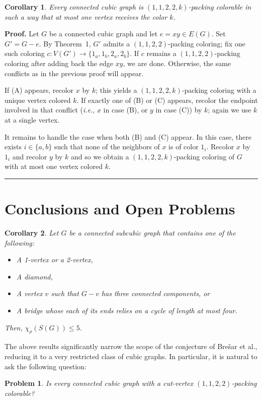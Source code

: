 \documentclass[12pt, oneside]{scrartcl}
\newtheorem{corollary}{Corollary}%
\newtheorem{problem}{Problem}
\newenvironment{proof}[1][Proof]{\textbf{#1.} }{\ \rule{0.5em}{0.5em}}
\begin{document}
\begin{corollary}
Every connected cubic graph is $(1,1,2,2,k)$-packing colorable in such a way that at most one vertex receives the color $k$.
\end{corollary}
\begin{proof}
Let $G$ be a connected cubic graph and let $e=xy\in E(G)$. Set $G'=G-e$. By Theorem~1, $G'$ admits a $(1,1,2,2)$-packing coloring; fix one such coloring
$c:V(G')\to\{1_a,1_b,2_a,2_b\}$.
If $c$ remains a $(1,1,2,2)$-packing coloring after adding back the edge $xy$, we are done. Otherwise, the same conflicts as in the previous proof will appear.

If \textup{(A)} appears, recolor $x$ by $k$; this yields a $(1,1,2,2,k)$-packing coloring with a unique vertex colored $k$.  
If exactly one of \textup{(B)} or \textup{(C)} appears, recolor the endpoint involved in that conflict (\emph{i.e.}, $x$ in case \textup{(B)}, or $y$ in case \textup{(C)}) by $k$; again we use $k$ at a single vertex.

It remains to handle the case when both \textup{(B)} and \textup{(C)} appear. In this case, there exists $i\in \{a,b\}$ such that none of the neighbors of $x$ is of color $1_i$.  Recolor $x$ by $1_i$ and recolor $y$ by $k$ and so we obtain
a $(1,1,2,2,k)$-packing coloring of $G$ with at most one vertex colored $k$.
\end{proof}

\section{Conclusions and Open Problems}

\begin{corollary}
    Let $G$ be a connected subcubic graph that contains one of the following:\begin{itemize}
        \item[(i)] A 1-vertex or a 2-vertex,
      \item[(ii)] A diamond, 
       \item[(iii)] A vertex $v$ such that $G-v$ has three connected components, or
       \item[(iv)] A bridge whose each of its ends relies on a cycle of length at most four.
    \end{itemize}
   Then, $\chi_{\rho}(S(G))\leq 5$.
\end{corollary}
The above results significantly narrow the scope of the conjecture of Bre\v{s}ar et al., reducing it to a very restricted class of cubic graphs. In particular, it is natural to ask the following question:
\begin{problem}
Is every connected cubic graph with a cut-vertex $(1,1,2,2)$-packing colorable?
\end{problem}
\end{document}
